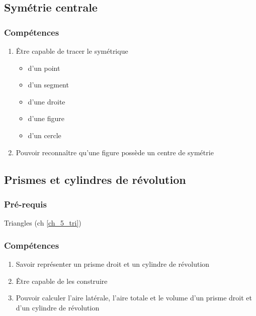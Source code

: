 \subsection{Symétrie centrale}\label{ch_5_sym}	

\subsubsection*{Compétences}
\begin{enumerate}
	\item Être capable de tracer le symétrique
	\begin{itemize}
		\item d'un point
		\item d'un segment
		\item d'une droite
		\item d'une figure
		\item d'un cercle		
	\end{itemize}
	\item Pouvoir reconnaître qu'une figure possède un centre de symétrie
\end{enumerate}

\subsection{Prismes et cylindres de révolution}\label{ch_5_prismes}

\subsubsection*{Pré-requis}
	Triangles (ch \ref{ch_5_tri})
	
\subsubsection*{Compétences}	
\begin{enumerate}
	\item Savoir représenter un prisme droit et un cylindre de révolution
	\item Être capable de les construire
	\item Pouvoir calculer l'aire latérale, l'aire totale et le volume d'un prisme droit et d'un cylindre de révolution
\end{enumerate}
